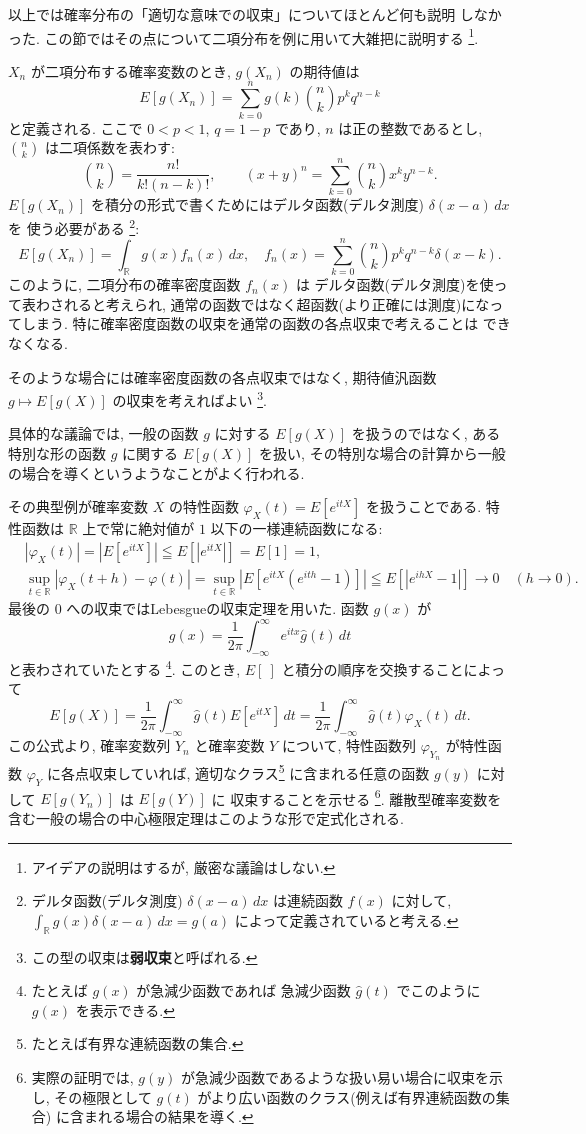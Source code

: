 \documentclass[12pt,twoside]{jarticle}
\newcommand\R{{\mathbb R}} %
\theoremstyle{jplain}
\theoremstyle{jplain}
\theoremstyle{jplain}
\numberwithin{theorem}{section}
\numberwithin{equation}{section}
\numberwithin{figure}{section}
\numberwithin{table}{section}
\begin{document}
以上では確率分布の「適切な意味での収束」についてほとんど何も説明
しなかった. この節ではその点について二項分布を例に用いて大雑把に説明する%
\footnote{アイデアの説明はするが, 厳密な議論はしない.}.

$X_n$ が二項分布する確率変数のとき, $g(X_n)$ の期待値は
\[
E[g(X_n)] = \sum_{k=0}^n g(k) \binom{n}{k}p^k q^{n-k}
\]
と定義される. ここで $0<p<1$, $q=1-p$ であり, $n$ は正の整数であるとし,
$\binom{n}{k}$ は二項係数を表わす:
\[
\binom{n}{k}
=\frac{n!}{k!(n-k)!}, \qquad
(x+y)^n
=\sum_{k=0}^n \binom{n}{k} x^k y^{n-k}.
\]
$E[g(X_n)]$ を積分の形式で書くためにはデルタ函数(デルタ測度) $\delta(x-a)\,dx$ を
使う必要がある%
\footnote{デルタ函数(デルタ測度) $\delta(x-a)\,dx$ は連続函数 $f(x)$ に対して,
$\int_\R g(x)\delta(x-a)\,dx = g(a)$ によって定義されていると考える.}:
\[
E[g(X_n)] = \int_\R g(x)f_n(x)\,dx,
\quad
f_n(x) = \sum_{k=0}^n\binom{n}{k}p^k q^{n-k}\delta(x-k).
\]
このように, 二項分布の確率密度函数 $f_n(x)$ は
デルタ函数(デルタ測度)を使って表わされると考えられ,
通常の函数ではなく超函数(より正確には測度)になってしまう.
特に確率密度函数の収束を通常の函数の各点収束で考えることは
できなくなる.

そのような場合には確率密度函数の各点収束ではなく,
期待値汎函数 $g\mapsto E[g(X)]$ の収束を考えればよい%
\footnote{この型の収束は{\bfseries 弱収束}と呼ばれる.}.

具体的な議論では, 一般の函数 $g$ に対する $E[g(X)]$ を扱うのではなく,
ある特別な形の函数 $g$ に関する $E[g(X)]$ を扱い,
その特別な場合の計算から一般の場合を導くというようなことがよく行われる.

その典型例が確率変数 $X$ の特性函数 $\varphi_X(t)=E[e^{itX}]$ を扱うことである.
特性函数は $\R$ 上で常に絶対値が $1$ 以下の一様連続函数になる:
\begin{align*}
&
|\varphi_X(t)|=\left|E[e^{itX}]\right|\leqq E\left[|e^{itX}|\right] = E[1]=1,
\\ &
\sup_{t\in\R}|\varphi_X(t+h)-\varphi(t)|
=\sup_{t\in\R}|E[e^{itX}(e^{ith}-1)]|
\leqq E\left[|e^{ihX}-1|\right]
\longrightarrow 0 \quad (h\to 0).
\end{align*}
最後の $0$ への収束ではLebesgueの収束定理を用いた.
函数 $g(x)$ が
\[
g(x) = \frac{1}{2\pi}\int_{-\infty}^\infty e^{itx} \widehat{g}(t)\,dt
\]
と表わされていたとする%
\footnote{たとえば $g(x)$ が急減少函数であれば
急減少函数 $\widehat{g}(t)$ でこのように $g(x)$ を表示できる.}.
このとき, $E[\ ]$ と積分の順序を交換することによって
\[
E[g(X)]
= \frac{1}{2\pi}\int_{-\infty}^\infty \widehat{g}(t) E[e^{itX}]\,dt
= \frac{1}{2\pi}\int_{-\infty}^\infty \widehat{g}(t) \varphi_X(t)\,dt.
\]
この公式より, 確率変数列 $Y_n$ と確率変数 $Y$ について,
特性函数列 $\varphi_{Y_n}$ が特性函数 $\varphi_Y$ に各点収束していれば,
適切なクラス\footnote{たとえば有界な連続函数の集合.}%
に含まれる任意の函数 $g(y)$ に対して $E[g(Y_n)]$ は $E[g(Y)]$ に
収束することを示せる%
\footnote{実際の証明では,
$g(y)$ が急減少函数であるような扱い易い場合に収束を示し,
その極限として $g(t)$ がより広い函数のクラス(例えば有界連続函数の集合)
に含まれる場合の結果を導く.}.
離散型確率変数を含む一般の場合の中心極限定理はこのような形で定式化される.
\end{document}

